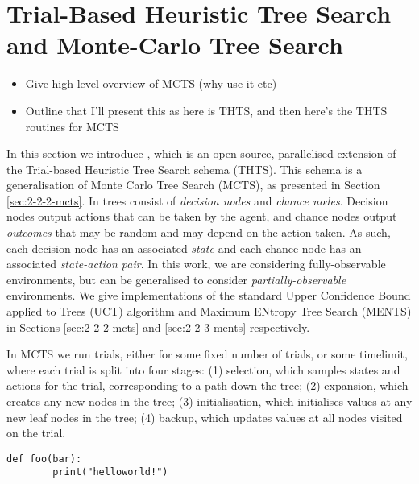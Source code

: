 \section{Trial-Based Heuristic Tree Search and Monte-Carlo Tree Search}
\label{sec:2-2-thts}

    \begin{itemize}
        \item Give high level overview of MCTS (why use it etc)
        \item Outline that I'll present this as here is THTS, and then here's the THTS routines for MCTS
    \end{itemize}



    In this section we introduce \thtspp\ewe \cite{thtspp}, which is an open-source, parallelised extension of the  Trial-based Heuristic Tree Search schema \cite{thts} (THTS). This schema is a generalisation of Monte Carlo Tree Search (MCTS), as presented in Section \ref{sec:2-2-2-mcts}. In \thtspp\ewe trees consist of \textit{decision nodes} and \textit{chance nodes}. Decision nodes output actions that can be taken by the agent, and chance nodes output \textit{outcomes} that may be random and may depend on the action taken. As such, each decision node has an associated \textit{state} and each chance node has an associated \textit{state-action pair}. In this work, we are considering fully-observable environments, but \thtspp\ewe can be generalised to consider \textit{partially-observable} environments. We give \thtspp\ewe implementations of the standard Upper Confidence Bound applied to Trees (UCT) algorithm and Maximum ENtropy Tree Search (MENTS) in Sections \ref{sec:2-2-2-mcts} and \ref{sec:2-2-3-ments} respectively.

    In MCTS we run trials, either for some fixed number of trials, or some timelimit, where each trial is split into four stages: 
        (1) selection, which samples states and actions for the trial, corresponding to a path down the tree;
        (2) expansion, which creates any new nodes in the tree; 
        (3) initialisation, which initialises values at any new leaf nodes in the tree;
        (4) backup, which updates values at all nodes visited on the trial.


    \begin{lstlisting}
def foo(bar):
        print("helloworld!")
    \end{lstlisting}

